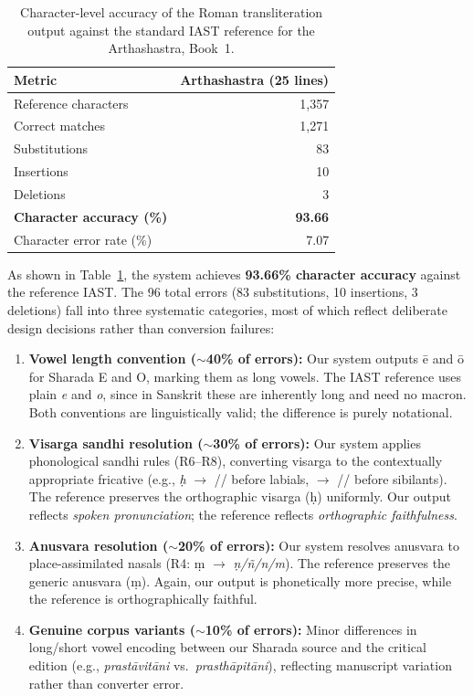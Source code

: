 \documentclass[11pt]{article}
\begin{document}
\begin{table}[h]
\centering
\small
\begin{tabular}{lr}
\toprule
\textbf{Metric} & \textbf{Arthashastra (25 lines)} \\
\midrule
Reference characters & 1,357 \\
Correct matches & 1,271 \\
Substitutions & 83 \\
Insertions & 10 \\
Deletions & 3 \\
\midrule
\textbf{Character accuracy (\%)} & \textbf{93.66} \\
Character error rate (\%) & 7.07 \\
\bottomrule
\end{tabular}
\caption{Character-level accuracy of the Roman transliteration output against the standard IAST reference for the Arthashastra, Book~1.}
\label{tab:accuracy}
\end{table}

As shown in Table~\ref{tab:accuracy}, the system achieves \textbf{93.66\% character accuracy} against the reference IAST. The 96 total errors (83 substitutions, 10 insertions, 3 deletions) fall into three systematic categories, most of which reflect deliberate design decisions rather than conversion failures:

\begin{enumerate}
    \item \textbf{Vowel length convention ($\sim$40\% of errors):} Our system outputs \={e} and \={o} for Sharada E and O, marking them as long vowels. The IAST reference uses plain \textit{e} and \textit{o}, since in Sanskrit these are inherently long and need no macron. Both conventions are linguistically valid; the difference is purely notational.
    
    \item \textbf{Visarga sandhi resolution ($\sim$30\% of errors):} Our system applies phonological sandhi rules (R6--R8), converting visarga to the contextually appropriate fricative (e.g., \textit{\d{h}} $\rightarrow$ // before labials, $\rightarrow$ // before sibilants). The reference preserves the orthographic visarga (\d{h}) uniformly. Our output reflects \textit{spoken pronunciation}; the reference reflects \textit{orthographic faithfulness}.
    
    \item \textbf{Anusvara resolution ($\sim$20\% of errors):} Our system resolves anusvara to place-assimilated nasals (R4: \d{m} $\rightarrow$ \textit{\d{n}/\~{n}/n/m}). The reference preserves the generic anusvara (\d{m}). Again, our output is phonetically more precise, while the reference is orthographically faithful.
    
    \item \textbf{Genuine corpus variants ($\sim$10\% of errors):} Minor differences in long/short vowel encoding between our Sharada source and the critical edition (e.g., \textit{prastāvitāni} vs.\ \textit{prasthāpitāni}), reflecting manuscript variation rather than converter error.
\end{enumerate}
\end{document}
